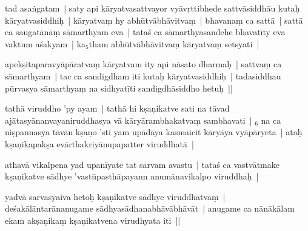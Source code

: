\documentclass[article,12pt,a4paper]{memoir}%
\newcounter{parCount}
\begin{document}
	  
	  \pstart \leavevmode%
	\label{thakur75-71.18}tad asaṅgatam | saty api kāryatvasattvayor vyāvṛttibhede \label{ratnakīrtinibandhāvali__36r1PF7IMT62ZHYE66V9OBOAHB0}sattvāsiddhāu\label{ratnakīrtinibandhāvali__36r1PF7IMT4VU9YSDDOV432L8BV} kutaḥ kāryatvasiddhiḥ | kāryatvaṃ hy abhūtvābhāvitvaṃ | bhavanaṃ ca sattā | sattā ca saugatānāṃ sāmarthyam eva | tataś ca sāmarthyasandehe bhavatīty eva vaktum aśakyam | ka{\tiny $_{5}$}tham abhūtvābhāvitvaṃ kāryatvaṃ setsyati |
	{}
	\pend%
      

	  
	  \pstart \leavevmode%
	\label{thakur75-71.21}apekṣitaparavyāpāratvaṃ kāryatvam ity api nāsato dharmaḥ | sattvaṃ ca sāmarthyam | tac ca sandigdham iti kutaḥ kāryatvasiddhiḥ | tadasiddhau pūrvasya sāmarthyaṃ na sidhyatīti sandigdhāsiddho hetuḥ ||
	{}
	\pend%
      

	  
	  \pstart \leavevmode%
	\label{thakur75-71.24}tathā viruddho 'py ayam | tathā hi kṣaṇikatve sati na tāvad ajātasyānanvayaniruddhasya vā kāryārambhakatvaṃ sambhavati | {\tiny $_{6}$} na ca niṣpannasya tāvān kṣaṇo 'sti yam upādāya kasmaicit kāryāya vyāpāryeta | ataḥ kṣaṇikapakṣa evārthakriyānupapatter viruddhatā |
	{}
	\pend%
      

	  
	  \pstart \leavevmode%
	\label{thakur75-71.27}athavā vikalpena yad upanīyate tat sarvam avastu | tataś ca vastvātmake kṣaṇikatve sādhye 'vastūpasthāpayann anumānavikalpo viruddhaḥ |
	{}
	\pend%
      

	  
	  \pstart \leavevmode%
	\label{thakur75-71.28}yadvā sarvasyaiva hetoḥ kṣaṇikatve sādhye viruddhatvaṃ | deśakālāntarānanugame sādhyasādhanabhāvābhāvāt | anugame ca nānākālam ekam akṣaṇikaṃ kṣaṇikatvena virudhyata iti ||
	{}
	\pend%
      
\end{document}

